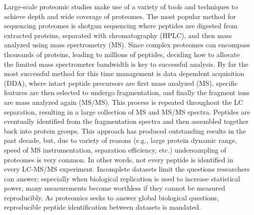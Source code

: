 Large-scale proteomic studies make use of a variety of tools and techniques to achieve depth and wide coverage of proteomes. The most popular method for sequencing proteomes is shotgun sequencing where peptides are digested from extracted proteins, separated with chromatography (HPLC), and then mass analyzed using mass spectrometry (MS).\cite{mudpit,mudpit2} Since complex proteomes can encompass thousands of proteins, leading to millions of peptides, deciding how to allocate the limited mass spectrometer bandwidth is key to successful analysis.\cite{100000} By far the most successful method for this time management is data dependent acquisition (DDA), where intact peptide precursors are first mass analyzed (MS), specific \mz{} features are then selected to undergo fragmentation, and finally the fragment ions are mass analyzed again (MS/MS). This process is repeated throughout the LC separation, resulting in a large collection of MS and MS/MS spectra. Peptides are eventually identified from the fragmentation spectra and then assembled together back into protein groups.\cite{sequest,sadygov,venable,panda,grouping} This approach has produced outstanding results in the past decade, but, due to variety of reasons (e.g., large protein dynamic range, speed of MS instrumentation, separation efficiency, etc.) undersampling of proteomes is very common. In other words, not every peptide is identified in every LC-MS/MS experiment. Incomplete datasets limit the questions researchers can answer; especially when biological replication is used to increase statistical power, many measurements become worthless if they cannot be measured reproducibly.\cite{quant} As proteomics seeks to answer global biological questions, reproducible peptide identification between datasets is mandated.\cite{ideker,msbp,molloy}

